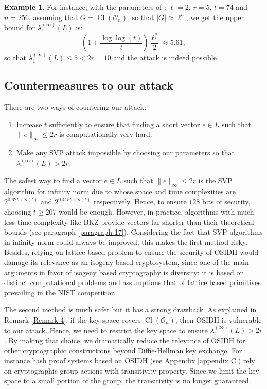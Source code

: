 \documentclass[a4paper,10pt]{report}
\theoremstyle{definition}
\theoremstyle{plain}
\theoremstyle{definition}
\newtheorem{Example}[Definition]{Example}
\newcommand{\mO}{\mathcal{O}}
\renewcommand{\(}{\left(}
\renewcommand{\)}{\right)}
\DeclareMathOperator{\Cl}{Cl}
\begin{document}
\begin{Example}
For instance, with the parameters of \cite[p. 28]{OSIDH}: $\ell=2$, $r=5$, $t=74$ and $n=256$, assuming that $G=\Cl(\mO_n)$, so that $|G|\approx\ell^n$, we get the upper bound for $\lambda_1^{(\infty)}(L)$ is:
\[\(1+\frac{\log\log(t)}{t}\)\frac{\ell^{\frac{n}{t}}}{2}\approx 5.61,\]
so that $\lambda_1^{(\infty)}(L)\leq 5<2r=10$ and the attack is indeed possible.
\end{Example}

\subsection{Countermeasures to our attack}

There are two ways of countering our attack: 
\begin{enumerate}
\item Increase $t$ sufficiently to ensure that finding a short vector $e\in L$ such that $\|e\|_\infty\leq 2r$ is computationally very hard.
\item Make any SVP attack impossible by choosing our parameters so that $\lambda_1^{(\infty)}(L)>2r$. 
\end{enumerate}

The safest way to find a vector $e\in L$ such that $\|e\|_\infty\leq 2r$ is the SVP algorithm for infinity norm due to \cite{Aggarwal2018} whose space and time complexities are $2^{0.62t+o(t)}$ and $2^{0.415t+o(t)}$ respectively. Hence, to ensure $128$ bits of security, choosing $t\geq 207$ would be enough. However, in practice, algorithms with much less time complexity like BKZ \cite{BKZ} provide vectors far shorter than their theoretical bounds (see paragraph \ref{paragraph 17}). Considering the fact that SVP algorithms in infinity norm could always be improved, this makes the first method risky. Besides, relying on lattice based problem to ensure the security of OSIDH would damage its relevance as an isogeny based cryptosystem, since one of the main arguments in favor of isogeny based cryptography is diversity: it is based on distinct computational problems and assumptions that of lattice based primitives prevailing in the NIST competition.

The second method is much safer but it has a strong drawback. As explained in Remark \ref{Remark 4}, if the key space covers $\Cl(\mO_n)$, then OSIDH is vulnerable to our attack. Hence, we need to restrict the key space to ensure $\lambda_1^{(\infty)}(L)>2r$. By making that choice, we dramatically reduce the relevance of OSIDH for other cryptographic constructions beyond Diffie-Hellman key exchange. For instance hash proof systems based on OSIDH (see Appendix \ref{appendix C}) rely on cryptographic group actions with transitivity property. Since we limit the key space to a small portion of the group, the transitivity is no longer guaranteed.
\end{document}
